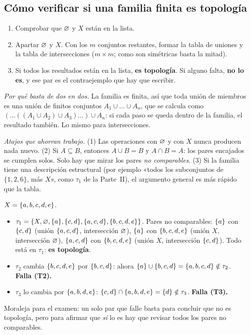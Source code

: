 \subsection{Cómo verificar si una familia finita es topología}\label{sec:verif}
\begin{metodo}
\begin{enumerate}[leftmargin=1.6em]
\item Comprobar que $\varnothing$ y $X$ están en la lista.
\item Apartar $\varnothing$ y $X$. Con los $m$ conjuntos restantes, formar la tabla de uniones y la tabla de intersecciones
($m\times m$; como son simétricas basta la mitad).
\item Si todos los resultados están en la lista, \textbf{es topología}. Si alguno falta, \textbf{no lo es}, y ese par
es el contraejemplo que hay que escribir.
\end{enumerate}
\end{metodo}
\emph{Por qué basta de dos en dos.} La familia es finita, así que toda unión de miembros es una unión de finitos
conjuntos $A_1\cup\dots\cup A_n$, que se calcula como $(\dots((A_1\cup A_2)\cup A_3)\dots)\cup A_n$: si cada paso se
queda dentro de la familia, el resultado también. Lo mismo para intersecciones.

\emph{Atajos que ahorran trabajo.} (1) Las operaciones con $\varnothing$ y con $X$ nunca producen nada nuevo.
(2) Si $A\subseteq B$, entonces $A\cup B=B$ y $A\cap B=A$: los pares encajados se cumplen solos. Solo hay que mirar
los pares \emph{no comparables}. (3) Si la familia tiene una descripción estructural (por ejemplo «todos los
subconjuntos de $\{1,2,6\}$, más $X$», como $\tau_1$ de la Parte~II), el argumento general es más rápido que la tabla.

\begin{ejemplo}
$X=\{a,b,c,d,e\}$.
\begin{itemize}
\item $\tau_1=\{X,\varnothing,\{a\},\{c,d\},\{a,c,d\},\{b,c,d,e\}\}$. Pares no comparables: $\{a\}$ con $\{c,d\}$ (unión
$\{a,c,d\}$, intersección $\varnothing$), $\{a\}$ con $\{b,c,d,e\}$ (unión $X$, intersección $\varnothing$), $\{a,c,d\}$ con
$\{b,c,d,e\}$ (unión $X$, intersección $\{c,d\}$). Todo está en $\tau_1$: \textbf{es topología}.
\item $\tau_2$ cambia $\{b,c,d,e\}$ por $\{b,c,d\}$: ahora $\{a\}\cup\{b,c,d\}=\{a,b,c,d\}\notin\tau_2$.
\textbf{Falla (T2).}
\item $\tau_3$ lo cambia por $\{a,b,d,e\}$: $\{c,d\}\cap\{a,b,d,e\}=\{d\}\notin\tau_3$. \textbf{Falla (T3).}
\end{itemize}
Moraleja para el examen: un solo par que falle basta para concluir que no es topología, pero para afirmar que
\emph{sí} lo es hay que revisar todos los pares no comparables.
\end{ejemplo}

